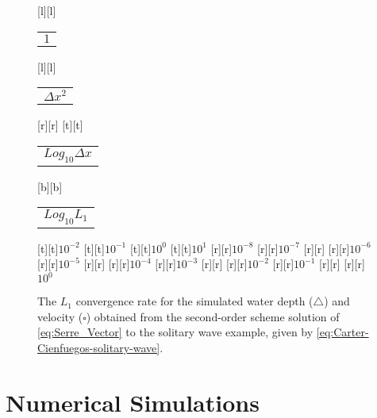 \documentclass[SingleSpace,12pt]{Serre_ASCE}
\begin{document}
\begin{figure}[htb]
\centering
\begin{psfrags}%
\psfragscanon%
%
[l][l]{\setlength{\tabcolsep}{0pt}\begin{tabular}{l}$1$\end{tabular}}%
[l][l]{\setlength{\tabcolsep}{0pt}\begin{tabular}{l}$\Delta x^2$\end{tabular}}%
[r][r]{}%
[t][t]{\setlength{\tabcolsep}{0pt}\begin{tabular}{c}{\Large $Log_{10}\Delta x$}\end{tabular}}%
[b][b]{\setlength{\tabcolsep}{0pt}\begin{tabular}{c}{\Large $Log_{10}L_1$}\end{tabular}}%
%
[t][t]{$10^{-2}$}%
[t][t]{$10^{-1}$}%
[t][t]{$10^{0}$}%
[t][t]{$10^{1}$}%
%
[r][r]{$10^{-8}$}%
[r][r]{$10^{-7}$}%
[r][r]{}%
[r][r]{$10^{-6}$}%
[r][r]{$10^{-5}$}%
[r][r]{}%
[r][r]{$10^{-4}$}%
[r][r]{$10^{-3}$}%
[r][r]{}%
[r][r]{$10^{-2}$}%
[r][r]{$10^{-1}$}%
[r][r]{}%
[r][r]{$10^{0}$}%
%
%
\end{psfrags}%
\caption{The $L_1$ convergence rate for the simulated water depth ($\triangle$) and velocity ($\square$) obtained from the second-order scheme solution of \eqref{eq:Serre_Vector} to the solitary wave example,  given by \eqref{eq:Carter-Cienfuegos-solitary-wave}.}
\label{fig:Convergence_Soliton_second-order}
\end{figure}

\section{Numerical Simulations}
\label{section:Numerical Simulations}
\end{document}
